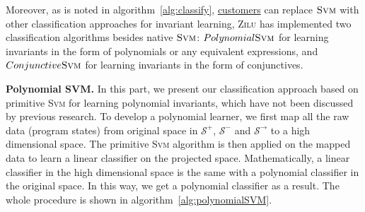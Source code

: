
Moreover, as is noted in algorithm~\ref{alg:classify}, \underline{customers} can replace $\textsc{Svm}$ with other classification approaches for invariant learning,
\textsc{Zilu} has implemented two classification algorithms besides native $\textsc{Svm}$: 
$Polynomial \textsc{Svm}$ for learning invariants in the form of polynomials or any equivalent expressions,
and $Conjunctive \textsc{Svm}$ for learning invariants in the form of conjunctives.

\medskip\noindent
\textbf{Polynomial SVM.}
In this part, we present our classification approach based on primitive \textsc{Svm} for learning polynomial invariants,
which have not been discussed by previous research.
To develop a polynomial learner, 
we first map all the raw data (program states) from original space in $\mathcal{S}^+$, $\mathcal{S}^-$ and $\mathcal{S}^\rightarrow$ 
to a high dimensional space.
The primitive \textsc{Svm} algorithm is then applied on the mapped data to learn a linear classifier on the projected space.%
Mathematically, a linear classifier in the high dimensional space is the same with a polynomial classifier in the original space.
In this way, we get a polynomial classifier as a result.
The whole procedure is shown in algorithm~\ref{alg:polynomialSVM}.

